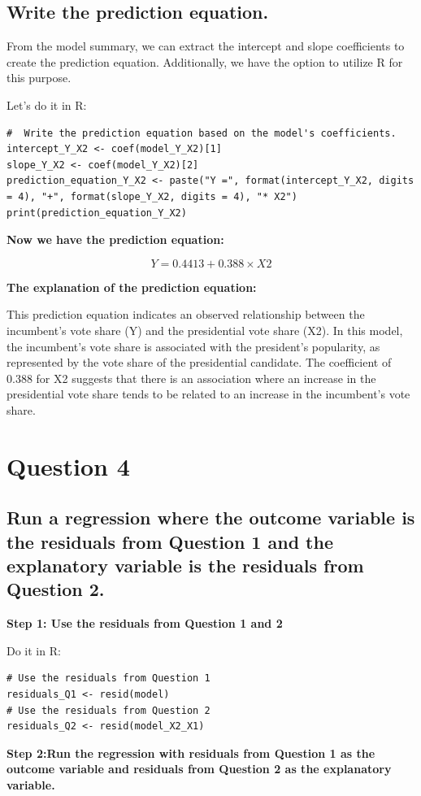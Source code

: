 \documentclass[12pt]{article}
\begin{document}
\subsection{Write the prediction equation.}
From the model summary, we can extract the intercept and slope coefficients to create the prediction equation. Additionally, we have the option to utilize R for this purpose.
 
Let's do it in R:
\begin{lstlisting}
#  Write the prediction equation based on the model's coefficients.
intercept_Y_X2 <- coef(model_Y_X2)[1]
slope_Y_X2 <- coef(model_Y_X2)[2]
prediction_equation_Y_X2 <- paste("Y =", format(intercept_Y_X2, digits = 4), "+", format(slope_Y_X2, digits = 4), "* X2")
print(prediction_equation_Y_X2)
\end{lstlisting}
\textbf{Now we have the prediction equation:}

\begin{equation}
Y = 0.4413 + 0.388 \times X2
\end{equation}

\textbf{The explanation of the prediction equation:}

This prediction equation indicates an observed relationship between the incumbent's vote share (Y) and the presidential vote share (X2). In this model, the incumbent's vote share is associated with the president's popularity, as represented by the vote share of the presidential candidate. The coefficient of 0.388 for X2 suggests that there is an association where an increase in the presidential vote share tends to be related to an increase in the incumbent's vote share.


\section{Question 4}
\subsection{Run a regression where the outcome variable is the residuals from Question 1 and the
explanatory variable is the residuals from Question 2.}
\textbf{Step 1: Use the residuals from Question 1 and 2}

Do it in R: 
\begin{lstlisting}
# Use the residuals from Question 1
residuals_Q1 <- resid(model)
# Use the residuals from Question 2
residuals_Q2 <- resid(model_X2_X1)
\end{lstlisting}
\textbf{Step 2:Run the regression with residuals from Question 1 as the outcome variable and residuals from Question 2 as the explanatory variable.}
\end{document}
